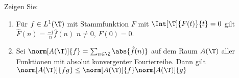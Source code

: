 
\begin{exercise}

Zeigen Sie:

\begin{enumerate}[label = (\roman*)]

    \item Für $f \in L^1(\T)$ mit Stammfunktion $F$ mit $\Int[\T]{F(t)}{t} = 0$ gilt $\hat F(n) = \frac{-i}{n} \hat f(n)$ $n \neq 0$, $F(0) = 0$.
    
    \item Sei $\norm[A(\T)]{f} = \sum_{n \in \Z} \abs{\hat f(n)}$ auf dem Raum $A(\T)$ aller Funktionen mit absolut konvergenter Fourierreihe.
    Dann gilt $\norm[A(\T)]{f g} \leq \norm[A(\T)]{f} \norm[A(\T)]{g}$

\end{enumerate}

\end{exercise}


